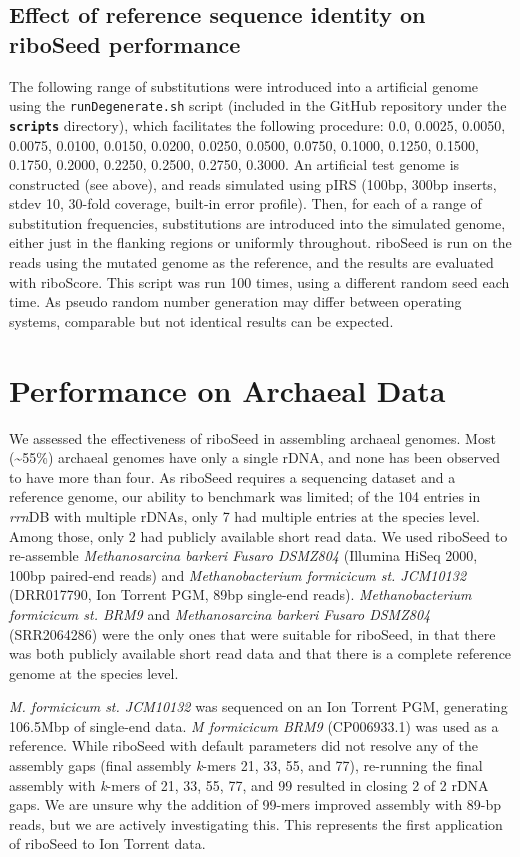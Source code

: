 \documentclass[10pt]{article}
\def \ttilde {\raisebox{-.5ex}\textasciitilde} %
\begin{document}
\subsection*{Effect of reference sequence identity on riboSeed performance}
The following range of substitutions were introduced into a artificial genome using the \texttt{runDegenerate.sh} script (included in the GitHub repository under the \textbf{\texttt{scripts}} directory), which facilitates the following procedure: 0.0, 0.0025, 0.0050, 0.0075, 0.0100, 0.0150, 0.0200, 0.0250, 0.0500, 0.0750, 0.1000, 0.1250, 0.1500, 0.1750, 0.2000, 0.2250, 0.2500, 0.2750, 0.3000. An artificial test genome is constructed (see above), and reads simulated using pIRS (100bp, 300bp inserts, stdev 10, 30-fold coverage, built-in error profile).  Then, for each of a range of substitution frequencies, substitutions are introduced into the simulated genome, either just in the flanking regions or uniformly throughout. riboSeed is run on the reads using the mutated genome as the reference, and the results are evaluated with riboScore. This script was run 100 times, using a different random seed each time.  As pseudo random number generation may differ between operating systems, comparable but not identical results can be expected.

\section*{Performance on Archaeal Data}

We assessed the effectiveness of riboSeed in assembling archaeal genomes. Most (\ttilde55\%) archaeal genomes have only a single rDNA, and none has been observed to have more than four. As riboSeed requires a sequencing dataset and a reference genome, our ability to benchmark was limited; of the 104 entries in \textit{rrn}DB with multiple rDNAs, only 7 had multiple entries at the species level. Among those, only 2 had publicly available short read data. We used riboSeed to re-assemble \textit{Methanosarcina barkeri Fusaro DSMZ804} (Illumina HiSeq 2000, 100bp paired-end reads) and \textit{Methanobacterium formicicum st. JCM10132} (DRR017790, Ion Torrent PGM, 89bp single-end reads). \textit{Methanobacterium formicicum st. BRM9} and \textit{Methanosarcina barkeri Fusaro DSMZ804} (SRR2064286) were the only ones that were suitable for riboSeed, in that there was both publicly available short read data and that there is a complete reference genome at the species level.

\textit{M. formicicum st. JCM10132} was sequenced on an Ion Torrent PGM, generating 106.5Mbp of single-end data. \textit{M formicicum BRM9} (CP006933.1) was used as a reference. While riboSeed with default parameters did not resolve any of the assembly gaps (final assembly \textit{k}-mers 21, 33, 55, and 77), re-running the final assembly with \textit{k}-mers of 21, 33, 55, 77, and 99 resulted in closing 2 of 2 rDNA gaps. We are unsure why the addition of 99-mers improved assembly with 89-bp reads, but we are actively investigating this. This represents the first application of riboSeed to Ion Torrent data.
\end{document}
